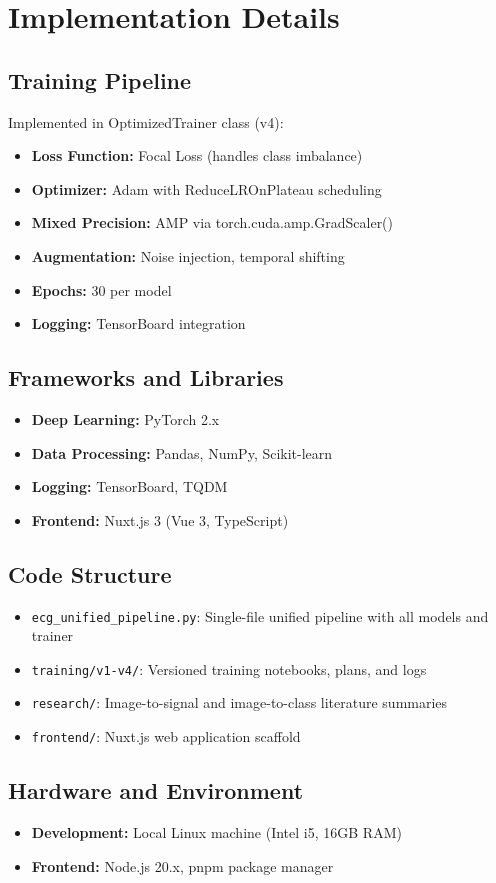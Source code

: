 \chapter{Implementation Details}
\label{chap:implementation}

\section{Training Pipeline}
Implemented in OptimizedTrainer class (v4):
\begin{itemize}
    \item \textbf{Loss Function:} Focal Loss (handles class imbalance)
    \item \textbf{Optimizer:} Adam with ReduceLROnPlateau scheduling
    \item \textbf{Mixed Precision:} AMP via torch.cuda.amp.GradScaler()
    \item \textbf{Augmentation:} Noise injection, temporal shifting
    \item \textbf{Epochs:} 30 per model
    \item \textbf{Logging:} TensorBoard integration
\end{itemize}

\section{Frameworks and Libraries}
\begin{itemize}
    \item \textbf{Deep Learning:} PyTorch 2.x
    \item \textbf{Data Processing:} Pandas, NumPy, Scikit-learn
    \item \textbf{Logging:} TensorBoard, TQDM
    \item \textbf{Frontend:} Nuxt.js 3 (Vue 3, TypeScript)
\end{itemize}

\section{Code Structure}
\begin{itemize}
    \item \texttt{ecg\_unified\_pipeline.py}: Single-file unified pipeline with all models and trainer
    \item \texttt{training/v1-v4/}: Versioned training notebooks, plans, and logs
    \item \texttt{research/}: Image-to-signal and image-to-class literature summaries
    \item \texttt{frontend/}: Nuxt.js web application scaffold
\end{itemize}

\section{Hardware and Environment}
\begin{itemize}
    \item \textbf{Development:} Local Linux machine (Intel i5, 16GB RAM)
    \item \textbf{Frontend:} Node.js 20.x, pnpm package manager
\end{itemize}
